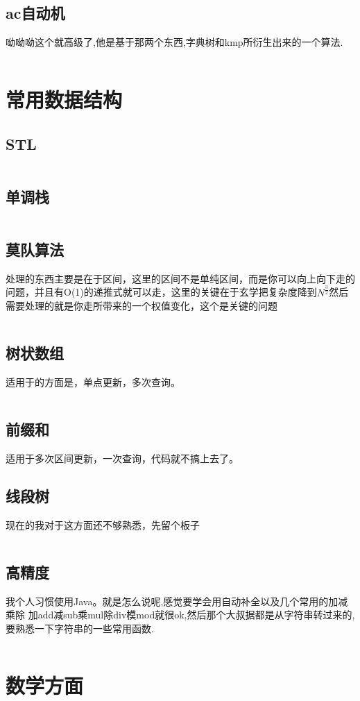 \documentclass[a4paper,13.6pt]{article}
\begin{document}
\begin{CJK}{UTF8}{gbsn}
\subsection{ac自动机}
呦呦呦这个就高级了,他是基于那两个东西,字典树和kmp所衍生出来的一个算法.
\inputminted{c++}{../scoure/date/aczidongji.cpp}
\section{常用数据结构}
\subsection{STL}
\inputminted{c++}{../scoure/date/duilie.cpp}
\subsection{单调栈}
\inputminted{c++}{../scoure/date/dandianzhan.cpp}
\subsection{莫队算法}
处理的东西主要是在于区间，这里的区间不是单纯区间，而是你可以向上向下走的问题，并且有O(1)的递推式就可以走，这里的关键在于玄学把复杂度降到$N^{\frac{3}{2}}$然后需要处理的就是你走所带来的一个权值变化，这个是关键的问题
\inputminted{c++}{../scoure/date/mudui.cpp}
\subsection{树状数组}
适用于的方面是，单点更新，多次查询。
\inputminted{c++}{../scoure/date/treevector.cpp}
\subsection{前缀和}
适用于多次区间更新，一次查询，代码就不搞上去了。
\subsection{线段树}
现在的我对于这方面还不够熟悉，先留个板子
\inputminted{c++}{../scoure/date/treexian.cpp}
\subsection{高精度}
我个人习惯使用Java。就是怎么说呢,感觉要学会用自动补全以及几个常用的加减乘除
加add减sub乘mul除div模mod就很ok,然后那个大叔据都是从字符串转过来的,要熟悉一下字符串的一些常用函数.
\inputminted{java}{../scoure/date/bigjing.java}
\section{数学方面}

\end{CJK}
\end{document}
